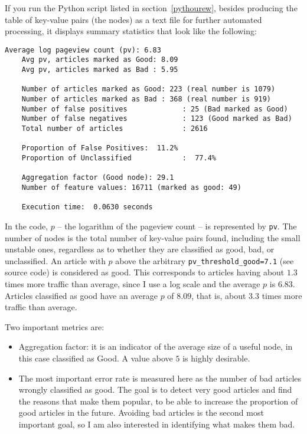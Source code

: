 \documentclass[oneside,10pt]{book}
\begin{document}
If you run the Python script listed in section~\ref{pythourew}, besides producing the table of key-value pairs (the nodes) as a text file for further automated processing, it displays summary statistics that look like the following:

\begin{lstlisting}[frame=none] 
    Average log pageview count (pv): 6.83
    Avg pv, articles marked as Good: 8.09
    Avg pv, articles marked as Bad : 5.95

    Number of articles marked as Good: 223 (real number is 1079)
    Number of articles marked as Bad : 368 (real number is 919)
    Number of false positives             : 25 (Bad marked as Good)
    Number of false negatives             : 123 (Good marked as Bad)
    Total number of articles              : 2616

    Proportion of False Positives:  11.2%
    Proportion of Unclassified            :  77.4%

    Aggregation factor (Good node): 29.1
    Number of feature values: 16711 (marked as good: 49)

    Execution time:  0.0630 seconds
\end{lstlisting}

\noindent In the code, $p$ -- the logarithm of the pageview count -- is represented by  \texttt{pv}. The number of nodes is the total number of key-value pairs found, including the small unstable ones, regardless as to whether they are classified as good, bad, or unclassified. An article with $p$ above the arbitrary  \texttt{pv\_threshold\_good=7.1} (see source code) is considered as good. This corresponds to articles having about $1.3$ times more traffic than average, since I use a log scale and the average $p$ is $6.83$. Articles classified as good have an average $p$ of $8.09$, that is, about $3.3$ times more traffic than average. 

\noindent Two important metrics are:
\begin{itemize}
\item Aggregation factor: it is an indicator of the average size of a useful node, in this case classified as Good. A value above $5$ is highly desirable.
\item The most important error rate is measured here as the number of bad articles wrongly classified as good. The goal is to detect very good articles and find the reasons that make  them popular, to be able to increase the proportion of good articles in the future. Avoiding bad articles is the second most important goal, so I am also interested in identifying what makes them bad.
\end{itemize}
\end{document}
